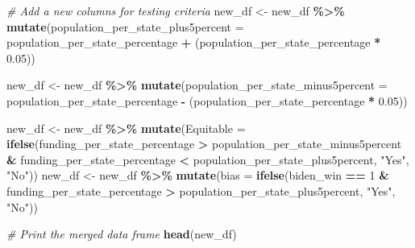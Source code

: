 \documentclass[
]{article}
\newenvironment{Shaded}{\begin{snugshade}}{\end{snugshade}}
\newcommand{\AttributeTok}[1]{\textcolor[rgb]{0.13,0.29,0.53}{#1}}
\newcommand{\CommentTok}[1]{\textcolor[rgb]{0.56,0.35,0.01}{\textit{#1}}}
\newcommand{\DecValTok}[1]{\textcolor[rgb]{0.00,0.00,0.81}{#1}}
\newcommand{\FloatTok}[1]{\textcolor[rgb]{0.00,0.00,0.81}{#1}}
\newcommand{\FunctionTok}[1]{\textcolor[rgb]{0.13,0.29,0.53}{\textbf{#1}}}
\newcommand{\NormalTok}[1]{#1}
\newcommand{\OtherTok}[1]{\textcolor[rgb]{0.56,0.35,0.01}{#1}}
\newcommand{\SpecialCharTok}[1]{\textcolor[rgb]{0.81,0.36,0.00}{\textbf{#1}}}
\newcommand{\StringTok}[1]{\textcolor[rgb]{0.31,0.60,0.02}{#1}}
\begin{document}
\begin{Shaded}
\begin{Highlighting}[]
\CommentTok{\# Add a new columns for testing criteria}
\NormalTok{new\_df }\OtherTok{\textless{}{-}}\NormalTok{ new\_df }\SpecialCharTok{\%\textgreater{}\%}
  \FunctionTok{mutate}\NormalTok{(}\AttributeTok{population\_per\_state\_plus5percent =}\NormalTok{ population\_per\_state\_percentage }\SpecialCharTok{+}\NormalTok{ (population\_per\_state\_percentage }\SpecialCharTok{*} \FloatTok{0.05}\NormalTok{))}


\NormalTok{new\_df }\OtherTok{\textless{}{-}}\NormalTok{ new\_df }\SpecialCharTok{\%\textgreater{}\%}
  \FunctionTok{mutate}\NormalTok{(}\AttributeTok{population\_per\_state\_minus5percent =}\NormalTok{ population\_per\_state\_percentage }\SpecialCharTok{{-}}\NormalTok{ (population\_per\_state\_percentage }\SpecialCharTok{*} \FloatTok{0.05}\NormalTok{))}

\NormalTok{new\_df }\OtherTok{\textless{}{-}}\NormalTok{ new\_df }\SpecialCharTok{\%\textgreater{}\%}
  \FunctionTok{mutate}\NormalTok{(}\AttributeTok{Equitable =} \FunctionTok{ifelse}\NormalTok{(funding\_per\_state\_percentage }\SpecialCharTok{\textgreater{}}\NormalTok{ population\_per\_state\_minus5percent }\SpecialCharTok{\&} 
\NormalTok{                            funding\_per\_state\_percentage }\SpecialCharTok{\textless{}}\NormalTok{ population\_per\_state\_plus5percent, }
                            \StringTok{"Yes"}\NormalTok{, }\StringTok{"No"}\NormalTok{))}
\NormalTok{new\_df }\OtherTok{\textless{}{-}}\NormalTok{ new\_df }\SpecialCharTok{\%\textgreater{}\%}
  \FunctionTok{mutate}\NormalTok{(}\AttributeTok{bias =} \FunctionTok{ifelse}\NormalTok{(biden\_win }\SpecialCharTok{==} \DecValTok{1} \SpecialCharTok{\&} 
\NormalTok{                       funding\_per\_state\_percentage }\SpecialCharTok{\textgreater{}}\NormalTok{ population\_per\_state\_plus5percent, }
                       \StringTok{"Yes"}\NormalTok{, }
                       \StringTok{"No"}\NormalTok{))}

\CommentTok{\# Print the merged data frame}
\FunctionTok{head}\NormalTok{(new\_df)}
\end{Highlighting}
\end{Shaded}
\end{document}
